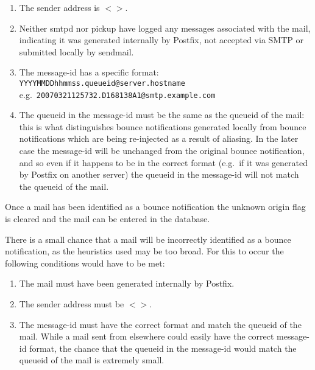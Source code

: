\documentclass[a4paper,12pt,draft]{article}
\begin{document}
\begin{enumerate}

    \item The sender address is $<>$.

    \item Neither smtpd nor pickup have logged any messages associated with
        the mail, indicating it was generated internally by Postfix, not
        accepted via SMTP or submitted locally by sendmail.

    \item The message-id has a specific format: \newline
        \texttt{YYYYMMDDhhmmss.queueid@server.hostname} \newline
        e.g.\ \texttt{20070321125732.D168138A1@smtp.example.com}

    \item The queueid in the message-id must be the same as the queueid of
        the mail: this is what distinguishes bounce notifications generated
        locally from bounce notifications which are being re-injected as a
        result of aliasing.  In the later case the message-id will be
        unchanged from the original bounce notification, and so even if it
        happens to be in the correct format (e.g.\ if it was generated by
        Postfix on another server) the queueid in the message-id will not
        match the queueid of the mail.

\end{enumerate}

Once a mail has been identified as a bounce notification the unknown origin
flag is cleared and the mail can be entered in the database.

There is a small chance that a mail will be incorrectly identified as a
bounce notification, as the heuristics used may be too broad.  For this to
occur the following conditions would have to be met:

\begin{enumerate}

    \item The mail must have been generated internally by Postfix.

    \item The sender address must be $<>$.

    \item The message-id must have the correct format and match the queueid
        of the mail.  While a mail sent from elsewhere could easily have
        the correct message-id format, the chance that the queueid in the
        message-id would match the queueid of the mail is extremely small.

\end{enumerate}
\end{document}
